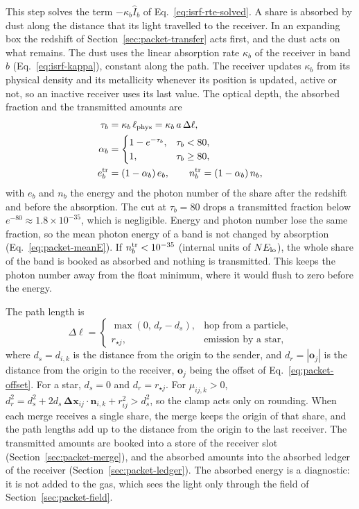 This step solves the term $-\kappa_b\hat I_b$ of
Eq.~\eqref{eq:isrf-rte-solved}. A share is absorbed by dust along the distance
that its light travelled to the receiver. In an expanding box the redshift of
Section~\ref{sec:packet-transfer} acts first, and the dust acts on what
remains. The dust uses the linear absorption rate $\kappa_b$ of the receiver
in band $b$ (Eq.~\eqref{eq:isrf-kappa}), constant along the path. The receiver
updates $\kappa_b$ from its physical density and its metallicity whenever its
position is updated, active or not, so an inactive receiver uses its last
value. The optical
depth, the absorbed fraction and the transmitted amounts are
\begin{align}
  \tau_b &= \kappa_b\,\ell_{\rm phys} = \kappa_b\,a\,\Delta\ell, \label{eq:packet-tau}\\
  \alpha_b &=
  \begin{cases}
    1-e^{-\tau_b}, & \tau_b<80,\\
    1, & \tau_b\ge 80,
  \end{cases} \label{eq:packet-alpha}\\
  e_{b}^{\rm tr} &= (1-\alpha_b)\,e_b, \qquad
  n_{b}^{\rm tr} = (1-\alpha_b)\,n_b, \label{eq:packet-transmit}
\end{align}
with $e_b$ and $n_b$ the energy and the photon number of the share after the
redshift and before the absorption. The cut at $\tau_b=80$ drops a
transmitted fraction below $e^{-80}\approx1.8\times10^{-35}$, which is
negligible.
Energy and photon number lose the same
fraction, so the mean photon energy of a band is not changed by absorption
(Eq.~\eqref{eq:packet-meanE}). If $n^{\rm tr}_b<10^{-35}$ (internal units of
$N E_{\rm lo}$), the whole share of the band is booked as absorbed and nothing
is transmitted. This keeps the photon number away from the float minimum, where
it would flush to zero before the energy.

The path length is
\begin{equation}
  \Delta\ell =
  \begin{cases}
    \max(0,\,d_r-d_s), & \text{hop from a particle},\\
    r_{\star j}, & \text{emission by a star},
  \end{cases}
  \label{eq:packet-path}
\end{equation}
where $d_s=d_{i,k}$ is the distance from the origin to the sender, and
$d_r=|\boldsymbol{o}_j|$ is the distance from the origin to the receiver,
$\boldsymbol{o}_j$ being the offset of Eq.~\eqref{eq:packet-offset}. For a
star, $d_s=0$ and $d_r=r_{\star j}$. For $\mu_{ij,k}>0$,
$d_r^2=d_s^2+2d_s\,\boldsymbol{\Delta x}_{ij}\!\cdot\!\boldsymbol{n}_{i,k}+r_{ij}^2>d_s^2$,
so the clamp acts only on rounding. When each merge receives a single share,
the merge keeps the origin of that share, and the path lengths add up to the
distance from the origin to the last receiver. The transmitted amounts are
booked into a store of the receiver slot (Section~\ref{sec:packet-merge}),
and the absorbed amounts into the
absorbed ledger of the receiver (Section~\ref{sec:packet-ledger}). The absorbed
energy is a diagnostic: it is not added to the gas, which sees the light only
through the field of Section~\ref{sec:packet-field}.

